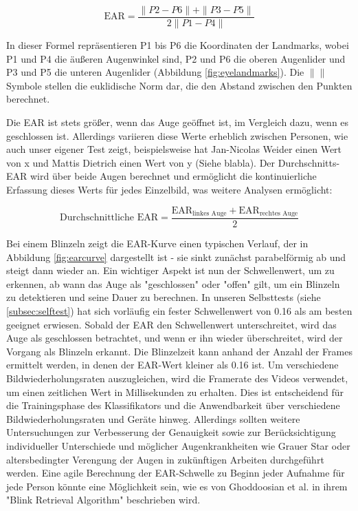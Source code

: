 \begin{equation}
	\text{EAR} = \frac{{\|P2 - P6\| + \|P3 - P5\|}}{{2\|P1 - P4\|}}
\end{equation}

In dieser Formel repräsentieren P1 bis P6 die Koordinaten der Landmarks, wobei P1 und P4 die äußeren Augenwinkel sind, P2 und P6 die oberen Augenlider und P3 und P5 die unteren Augenlider (Abbildung \ref{fig:eyelandmarks}). Die $ \| \| $ Symbole stellen die euklidische Norm dar, die den Abstand zwischen den Punkten berechnet.

Die EAR ist stets größer, wenn das Auge geöffnet ist, im Vergleich dazu, wenn es geschlossen ist. Allerdings variieren diese Werte erheblich zwischen Personen, wie auch unser eigener Test zeigt, beispielsweise hat Jan-Nicolas Weider einen Wert von x und Mattis Dietrich einen Wert von y (Siehe blabla). Der Durchschnitts-EAR wird über beide Augen berechnet und ermöglicht die kontinuierliche Erfassung dieses Werts für jedes Einzelbild, was weitere Analysen ermöglicht:

\begin{equation}
	\text{Durchschnittliche EAR} = \frac{{\text{EAR}_{\text{linkes Auge}} + \text{EAR}_{\text{rechtes Auge}}}}{2}
\end{equation}

Bei einem Blinzeln zeigt die EAR-Kurve einen typischen Verlauf, der in Abbildung \ref{fig:earcurve} dargestellt ist - sie sinkt zunächst parabelförmig ab und steigt dann wieder an. Ein wichtiger Aspekt ist nun der Schwellenwert, um zu erkennen, ab wann das Auge als "geschlossen" oder "offen" gilt, um ein Blinzeln zu detektieren und seine Dauer zu berechnen. In unseren Selbsttests (siehe \ref{subsec:selftest}) hat sich vorläufig ein fester Schwellenwert von 0.16 als am besten geeignet erwiesen. Sobald der EAR den Schwellenwert unterschreitet, wird das Auge als geschlossen betrachtet, und wenn er ihn wieder überschreitet, wird der Vorgang als Blinzeln erkannt. Die Blinzelzeit kann anhand der Anzahl der Frames ermittelt werden, in denen der EAR-Wert kleiner als 0.16 ist. Um verschiedene Bildwiederholungsraten auszugleichen, wird die Framerate des Videos verwendet, um einen zeitlichen Wert in Millisekunden zu erhalten. Dies ist entscheidend für die Trainingsphase des Klassifikators und die Anwendbarkeit über verschiedene Bildwiederholungsraten und Geräte hinweg.  Allerdings sollten weitere Untersuchungen zur Verbesserung der Genauigkeit sowie zur Berücksichtigung individueller Unterschiede und möglicher Augenkrankheiten wie Grauer Star oder altersbedingter Verengung der Augen in zukünftigen Arbeiten durchgeführt werden. Eine agile Berechnung der EAR-Schwelle zu Beginn jeder Aufnahme für jede Person könnte eine Möglichkeit sein, wie es von Ghoddoosian et al. \cite{GH19} in ihrem "Blink Retrieval Algorithm" beschrieben wird.

